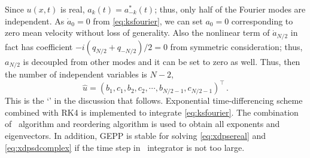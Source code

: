 \documentclass[final,leqno,onefignum,onetabnum]{siamltexmm}
\begin{document}
Since $u(x,t)$ is real, $a_{k}(t)=a^{*}_{-k}(t)$; thus, only half of the
Fourier modes are independent. As $\dot{a}_{0}=0$ from
\eqref{eq:ksfourier}, we can set $a_{0}=0$ corresponding to
zero mean velocity without loss of generality.
Also the nonlinear term
of $\dot{a}_{N/2}$ in fact has coefficient
{$-i(q_{N/2} + q_{-N/2})/2 = 0$}
from symmetric consideration;
thus, $a_{N/2}$ is decoupled from other modes and it
can be set to zero as well. Thus, then the number of independent variables
is $N-2$,
\begin{equation}
\label{eq:fourierspace}
\hat{u}=(b_{1},c_{1},b_{2},c_{2},\cdots,b_{N/2-1},c_{N/2-1})^\top
\,.
\end{equation}
This is the `\statesp' in the discussion that follows. Exponential time-differencing
scheme combined with RK4
is implemented to integrate
\eqref{eq:ksfourier}. The combination of {\psd\ algorithm and reordering
algorithm is used to obtain all exponents and eigenvectors. In addition,
GEPP is stable for solving}
\eqref{eq:xdpsereal} and \eqref{eq:xdpsdcomplex} if the
time step in \KS\ integrator is not too {large}.
\end{document}
